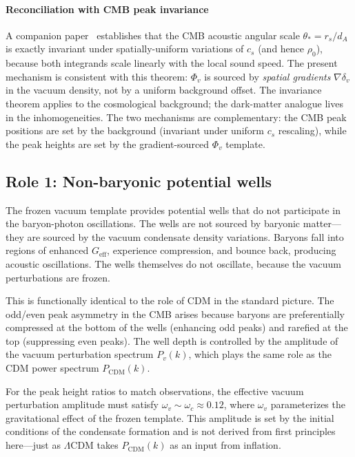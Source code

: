 \documentclass[12pt, a4paper]{article}
\newcommand{\Geff}{G_{\mathrm{eff}}}
\begin{document}
\paragraph{Reconciliation with CMB peak invariance}
A companion paper~\cite{kulangiev_2026c_cosmo} establishes that the CMB acoustic angular scale $\theta_* = r_s/d_A$ is exactly invariant under spatially-uniform variations of $c_s$ (and hence $\rho_0$), because both integrands scale linearly with the local sound speed. The present mechanism is consistent with this theorem: $\Phi_v$ is sourced by \emph{spatial gradients} $\nabla\delta_v$ in the vacuum density, not by a uniform background offset. The invariance theorem applies to the cosmological background; the dark-matter analogue lives in the inhomogeneities. The two mechanisms are complementary: the CMB peak positions are set by the background (invariant under uniform $c_s$ rescaling), while the peak heights are set by the gradient-sourced $\Phi_v$ template.

\subsection{Role 1: Non-baryonic potential wells}

The frozen vacuum template provides potential wells that do not participate in the baryon-photon oscillations. The wells are not sourced by baryonic matter---they are sourced by the vacuum condensate density variations. Baryons fall into regions of enhanced $\Geff$, experience compression, and bounce back, producing acoustic oscillations. The wells themselves do not oscillate, because the vacuum perturbations are frozen.

This is functionally identical to the role of CDM in the standard picture. The odd/even peak asymmetry in the CMB arises because baryons are preferentially compressed at the bottom of the wells (enhancing odd peaks) and rarefied at the top (suppressing even peaks). The well depth is controlled by the amplitude of the vacuum perturbation spectrum $P_v(k)$, which plays the same role as the CDM power spectrum $P_{\mathrm{CDM}}(k)$.

For the peak height ratios to match observations, the effective vacuum perturbation amplitude must satisfy $\omega_v \sim \omega_c \approx 0.12$, where $\omega_v$ parameterizes the gravitational effect of the frozen template. This amplitude is set by the initial conditions of the condensate formation and is not derived from first principles here---just as $\Lambda$CDM takes $P_{\mathrm{CDM}}(k)$ as an input from inflation.
\end{document}

